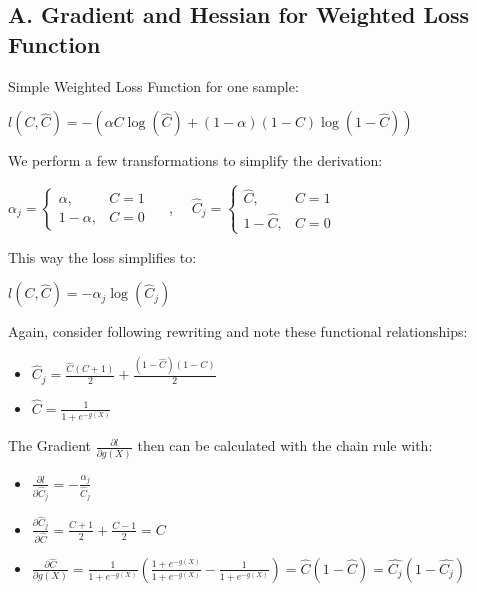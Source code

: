 \documentclass[12pt,titlepage]{article}
\begin{document}
\subsection*{A. Gradient and Hessian for Weighted Loss Function} \par
\vspace*{6mm}
\noindent
Simple Weighted Loss Function for one sample:
\begin{center}
$l(C, \hat{C}) = -\left(\alpha C\log(\hat{C}) + (1-\alpha)(1 - C)\log(1 - \hat{C})\right)$
\end{center}
\noindent
We perform a few transformations to simplify the derivation:
\begin{center}
    $\alpha_j = \begin{cases} \alpha,& C = 1 \\ 1 - \alpha,& C = 0 \end{cases}$\,\,\,\,\,\, ,\,\,\,\,\,\, $\hat{C}_j = \begin{cases} \hat{C},& C = 1 \\ 1 - \hat{C},& C = 0 \end{cases}$
\end{center}
\noindent
This way the loss simplifies to:
\begin{center}
    $l(C, \hat{C}) = -\alpha_j \log(\hat{C}_j)$
\end{center}
\noindent
Again, consider following rewriting and note these functional relationships:
\begin{itemize}
    \item $\hat{C}_j = \frac{\hat{C}(C+1)}{2} + \frac{(1-\hat{C})(1-C)}{2}$
    \item $\hat{C} = \frac{1}{1+e^{-g(X)}}$
\end{itemize}
\noindent
The Gradient $\frac{\partial l}{\partial g(X)}$ then can be calculated with the chain rule with:
\begin{itemize}
    \item $\frac{\partial l}{\partial \hat{C}_j} = - \frac{\alpha_j}{\hat{C}_j}$
    \item $\frac{\partial \hat{C}_j}{\partial \hat{C}} = \frac{C+1}{2} + \frac{C-1}{2} = C$
    \item $\frac{\partial \hat{C}}{\partial g(X)} = \frac{1}{1+e^{-g(X)}}(\frac{1+e^{-g(X)}}{1+e^{-g(X)}} - \frac{1}{1+e^{-g(X)}}) = \hat{C}(1-\hat{C}) = \hat{C_j}(1-\hat{C_j})$
\end{itemize}
\begin{center}
\end{center}
\end{document}
